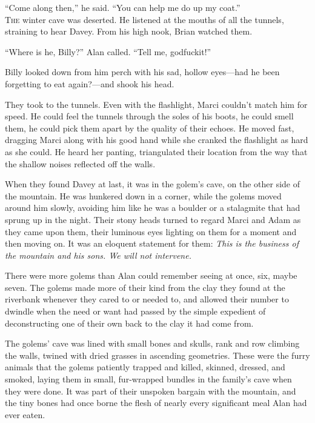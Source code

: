 \documentclass{article}
\begin{document}
``Come along then,'' he said.  ``You can help me do up my coat.''
\\
\lettrine[lines=3, lhang=.5, nindent=0pt, findent=2pt]{T}{he} winter cave was deserted.  He listened at the mouths of all the
tunnels, straining to hear Davey.  From his high nook, Brian watched
them.

``Where is he, Billy?'' Alan called.  ``Tell me, godfuckit!''

Billy looked down from him perch with his sad, hollow eyes---had he
been forgetting to eat again?---and shook his head.

They took to the tunnels.  Even with the flashlight, Marci couldn't
match him for speed.  He could feel the tunnels through the soles of
his boots, he could smell them, he could pick them apart by the
quality of their echoes.  He moved fast, dragging Marci along with his
good hand while she cranked the flashlight as hard as she could.  He
heard her panting, triangulated their location from the way that the
shallow noises reflected off the walls.

When they found Davey at last, it was in the golem's cave, on the
other side of the mountain.  He was hunkered down in a corner, while
the golems moved around him slowly, avoiding him like he was a boulder
or a stalagmite that had sprung up in the night.  Their stony heads
turned to regard Marci and Adam as they came upon them, their luminous
eyes lighting on them for a moment and then moving on.  It was an
eloquent statement for them:  \textit{This is the business of the
mountain and his sons.  We will not intervene.}

There were more golems than Alan could remember seeing at once, six,
maybe seven.  The golems made more of their kind from the clay they
found at the riverbank whenever they cared to or needed to, and
allowed their number to dwindle when the need or want had passed by
the simple expedient of deconstructing one of their own back to the
clay it had come from.

The golems' cave was lined with small bones and skulls, rank and row
climbing the walls, twined with dried grasses in ascending geometries. 
These were the furry animals that the golems patiently trapped and
killed, skinned, dressed, and smoked, laying them in small,
fur-wrapped bundles in the family's cave when they were done.  It was
part of their unspoken bargain with the mountain, and the tiny bones
had once borne the flesh of nearly every significant meal Alan had
ever eaten.
\end{document}
